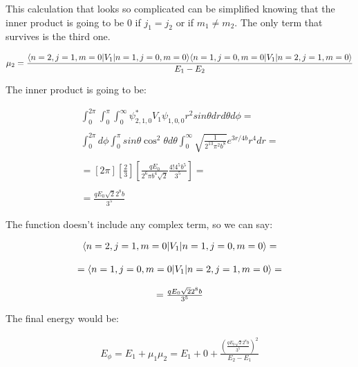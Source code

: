 This calculation that looks so complicated can be simplified knowing that the inner product is going to be 0 if $j_1 = j_2$ or if $m_1 \neq m_2$. The only term that survives is the third one.

\begin{equation}
  \mu_2 = \frac{\langle n=2,j=1,m=0\rvert V_1 \lvert n=1,j=0,m=0\rangle\langle n=1,j=0,m=0\rvert V_1 \lvert n=2,j=1,m=0\rangle}{E_1-E_2}
\end{equation}

The inner product is going to be:

\begin{equation}
  \begin{array}{c}
    \int_{0}^{2\pi} \int_{0}^{\pi} \int_{0}^{\infty} \psi_{2,1,0}^* V_1 \psi_{1,0,0} r^2 sin\theta dr d\theta d\phi =
    \\

    \\
    \int_{0}^{2\pi} d\phi \int_{0}^{\pi} sin\theta \cos^2\theta d\theta \int_{0}^{\infty} \sqrt{\frac{1}{2^13 \pi^2 b^8}} e^{3r/4b} r^4 dr =
    \\

    \\
    = [2\pi]\left[\frac{2}{3}\right]\left[\frac{qE_0}{2^6\pi b^4\sqrt{2}}\frac{4!4^5 b^5}{3^5} \right] =
    \\

    \\
    = \frac{qE_0 \sqrt{2} 2^8 b}{3^5}
  \end{array}
\end{equation}

The function doesn't include any complex term, so we can say:

\begin{equation}
  \begin{array}{c}
  \langle n=2,j=1,m=0\rvert V_1 \lvert n=1,j=0,m=0\rangle =
  \\

  \\
  = \langle n=1,j=0,m=0\rvert V_1 \lvert n=2,j=1,m=0\rangle =
  \\

  \\
  =\frac{qE_0 \sqrt{2} 2^8 b}{3^5}
  \end{array}
\end{equation}

The final energy would be:

\begin{equation}
  \begin{array}{c}
    E_{\phi} = E_1 + \mu_1 \mu_2 = E_1 + 0 + \frac{\left(\frac{qE_0 \sqrt{2} 2^8 b}{3^5}\right)^2}{E_2-E_1}
  \end{array}
\end{equation}


